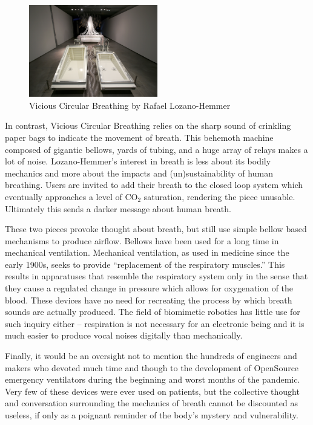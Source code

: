 \documentclass[letterpaper]{article}
\begin{document}
\begin{figure}[h]
\includegraphics[width=0.5\textwidth]{images/vcb_madrid_2014.jpg}
\caption{Vicious Circular Breathing by Rafael Lozano-Hemmer}
\label{fig:hemmer}
\end{figure}


In contrast, Vicious Circular Breathing relies on the sharp sound of crinkling paper bags to indicate the movement of breath. This behemoth machine composed of gigantic bellows, yards of tubing, and a huge array of relays makes a lot of noise. Lozano-Hemmer's interest in breath is less about its bodily mechanics and more about the impacts and (un)sustainability of human breathing. Users are invited to add their breath to the closed loop system which eventually approaches a level of CO$_2$ saturation, rendering the piece unusable. Ultimately this sends a darker message about human breath.

These two pieces provoke thought about breath, but still use simple bellow based mechanisms to produce airflow. Bellows have been used for a long time in mechanical ventilation. Mechanical ventilation, as used in medicine since the early 1900s, seeks to provide ``replacement of the respiratory muscles.''\cite{ventilatorhistory} This results in apparatuses that resemble the respiratory system only in the sense that they cause a regulated change in pressure which allows for oxygenation of the blood. These devices have no need for recreating the process by which breath sounds are actually produced. The field of biomimetic robotics has little use for such inquiry either -- respiration is not necessary for an electronic being and it is much easier to produce vocal noises digitally than mechanically. 

Finally, it would be an oversight not to mention the hundreds of engineers and makers who devoted much time and though to the development of OpenSource emergency ventilators during the beginning and worst months of the pandemic.\cite{read} Very few of these devices were ever used on patients, but the collective thought and conversation surrounding the mechanics of breath cannot be discounted as useless, if only as a poignant reminder of the body's mystery and vulnerability. 
\end{document}
